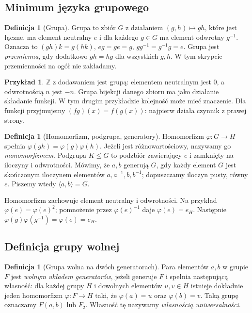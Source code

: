 \documentclass[11pt,a4paper]{article}
\numberwithin{equation}{section}
\theoremstyle{plain}
\theoremstyle{definition}
\newtheorem{definicja}[twierdzenie]{Definicja}
\newtheorem{przyklad}[twierdzenie]{Przykład}
\theoremstyle{remark}
\newcommand{\Z}{\mathbb Z}
\begin{document}
\subsection{Minimum języka grupowego}
\begin{definicja}[Grupa]
Grupa to zbiór $G$ z działaniem $(g,h)\mapsto gh$, które jest łączne, ma element neutralny $e$ i dla każdego $g\in G$ ma element odwrotny $g^{-1}$. Oznacza to $(gh)k=g(hk)$, $eg=ge=g$, $gg^{-1}=g^{-1}g=e$. Grupa jest \emph{przemienna}, gdy dodatkowo $gh=hg$ dla wszystkich $g,h$. W tym skrypcie przemienności na ogół nie zakładamy.
\end{definicja}
\begin{przyklad}
$\Z$ z dodawaniem jest grupą: elementem neutralnym jest $0$, a odwrotnością $n$ jest $-n$. Grupa bijekcji danego zbioru ma jako działanie składanie funkcji. W tym drugim przykładzie kolejność może mieć znaczenie. Dla funkcji przyjmujemy $(fg)(x)=f(g(x))$: najpierw działa czynnik z prawej strony.
\end{przyklad}
\begin{definicja}[Homomorfizm, podgrupa, generatory]
Homomorfizm $\varphi:G\to H$ spełnia $\varphi(gh)=\varphi(g)\varphi(h)$. Jeżeli jest różnowartościowy, nazywamy go \emph{monomorfizmem}. Podgrupa $K\le G$ to podzbiór zawierający $e$ i zamknięty na iloczyny i odwrotności. Mówimy, że $a,b$ generują $G$, gdy każdy element $G$ jest skończonym iloczynem elementów $a,a^{-1},b,b^{-1}$; dopuszczamy iloczyn pusty, równy $e$. Piszemy wtedy $\langle a, b\rangle=G.$
\end{definicja}
Homomorfizm zachowuje element neutralny i odwrotności. Na przykład $\varphi(e)=\varphi(e)^2$; pomnożenie przez $\varphi(e)^{-1}$ daje $\varphi(e)=e_H$. Następnie $\varphi(g)\varphi(g^{-1})=\varphi(e)=e_H$.

\subsection{Definicja grupy wolnej}
\begin{definicja}[Grupa wolna na dwóch generatorach]
\label{def:grupa-wolna}
Para elementów $a,b$ w grupie $F$ jest \emph{wolnym układem generatorów},
jeżeli generuje $F$ i spełnia następującą własność: dla każdej grupy
$H$ i dowolnych elementów $u,v\in H$ istnieje dokładnie jeden homomorfizm
$\varphi:F\to H$ taki, że $\varphi(a)=u$ oraz $\varphi(b)=v$.
Taką grupę oznaczamy $F(a,b)$ lub $F_2$. Własność tę nazywamy
\emph{własnością uniwersalności}.
\end{definicja}
\end{document}

